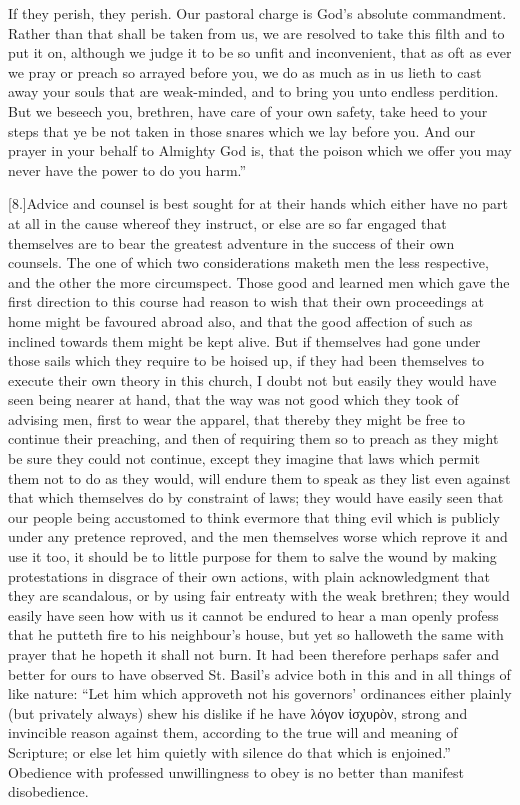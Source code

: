  If they perish, they perish. Our pastoral charge is God’s absolute commandment. Rather than that shall be taken from us, we are resolved to take this filth and to put it on, although we judge it to be so unfit and inconvenient, that as oft as ever we pray or preach so arrayed before you, we do as much as in us lieth to cast away your souls that are weak-minded, and to bring you unto endless perdition. But we beseech you, brethren, have care of your own safety, take heed to your steps that ye be not taken in those snares which we lay before you. And our prayer in your behalf to Almighty God is, that the poison which we offer you may never have the power to do you harm.”

[8.]Advice and counsel is best sought for at their hands which either have no part at all in the cause whereof they instruct, or else are so far engaged that themselves are to bear the greatest adventure in the success of their own counsels. The one of which two considerations maketh men the less respective, and the other the more circumspect. Those good and learned men which gave the first direction to this course had reason to wish that their own proceedings at home might be favoured abroad also, and that the good affection of such as inclined towards them might be kept alive. But if themselves had gone under those sails which they require to be hoised up, if they had been themselves to execute their own theory in this church, I doubt not but easily they would have seen being nearer at hand, that the way was not good which they took of advising men, first to wear the apparel, that thereby they might be free to continue their preaching, and then of requiring them so to preach as they might be sure they could not continue, except they imagine that laws which permit them not to do as they would, will endure them to speak as they list even against that which themselves do by constraint of laws; they would have easily seen that our people being accustomed to think evermore that thing evil which is publicly under any pretence reproved, and the men themselves worse which reprove it and use it too, it should be to little purpose for them to salve the wound by making protestations in disgrace of their own actions, with plain acknowledgment that they are scandalous, or by using fair  entreaty with the weak brethren;
 they would easily have seen how with us it cannot be endured to hear a man openly profess that he putteth fire to his neighbour’s house, but yet so halloweth the same with prayer that he hopeth it shall not burn. It had been therefore perhaps safer and better for ours to have observed St. Basil’s advice both in this and in all things of like nature: “Let him which approveth not his governors’ ordinances either plainly (but privately always) shew his dislike if he have λόγον ἰσχυρὸν, strong and invincible reason against them, according to the true will and meaning of Scripture; or else let him quietly with silence do that which is enjoined.” Obedience with professed unwillingness to obey is no better than manifest disobedience.


